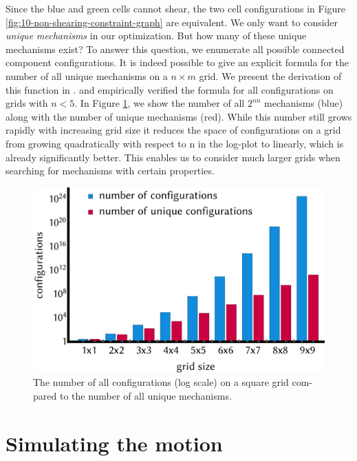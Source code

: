 Since the blue and green cells cannot shear, the two cell configurations in Figure \ref{fig:10-non-shearing-constraint-graph} are equivalent. We only want to consider \textit{unique mechanisms} in our optimization. But how many of these unique mechanisms exist? To answer this question, we enumerate all possible connected component configurations. It is indeed possible to give an explicit formula for the number of all unique mechanisms on a $n \times m$ grid. We present the derivation of this function in . and empirically verified the formula for all configurations on grids with $n<5$. In Figure \ref{fig:11-search-space-reduction}, we show the number of all $2^{nn}$ mechanisms (blue) along with the number of unique mechanisms (red). While this number still grows rapidly with increasing grid size it reduces the space of configurations on a grid from growing quadratically with respect to n in the log-plot to linearly, which is already significantly better. This enables us to consider much larger grids when searching for mechanisms with certain properties. 

\begin{figure} [h]
    \includegraphics[width=\textwidth]{chapters/understanding-metamaterial-mechanisms-FIG/11-search-space-reduction.png}
    \caption[Short figure name.]{The number of all configurations (log scale) on a square grid com-pared to the number of all unique mechanisms. 
    \label{fig:11-search-space-reduction}}
\end{figure}


\section{Simulating the motion}
\label{section:simulation}

